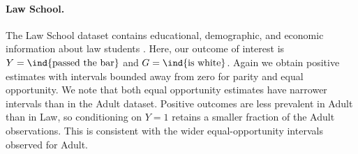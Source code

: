\paragraph{Law School.}
The Law School dataset contains educational, demographic, and economic information about law students \cite{wightmanLSACNationalLongitudinal1998} \cite{lequySurveyDatasetsFairnessaware2022}.
Here, our outcome of interest is $Y=\ind\{\text{passed the bar}\}$ and $G = \ind\{\text{is white}\}$.
Again we obtain positive estimates with intervals bounded away from zero for parity and equal opportunity.
We note that both equal opportunity estimates have narrower intervals than in the Adult dataset.
Positive outcomes are less prevalent in Adult than in Law, so conditioning on $Y=1$ retains a smaller fraction of the Adult observations.
This is consistent with the wider equal-opportunity intervals observed for Adult.
